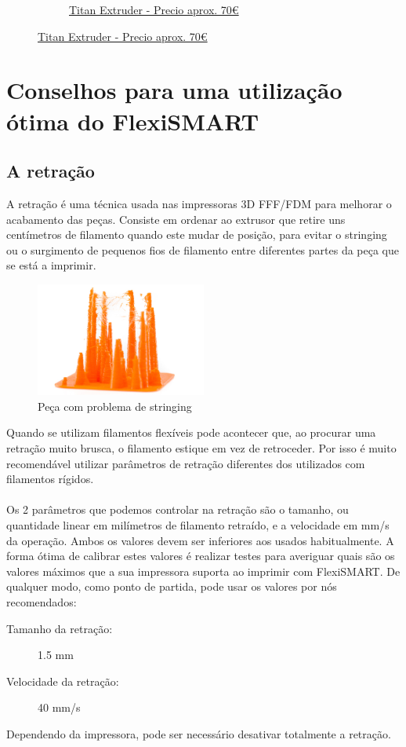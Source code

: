 \documentclass[11pt,a4paper]{article}
\begin{document}
\begin{figure}[H]
\begin{subfigure}[b]{0.4\textwidth}
		\caption*{\href{www.e3d-online.com}{{\footnotesize Titan Extruder - Precio aprox. 70\euro}}}
    \end{subfigure}
\end{figure}
\section{Conselhos para uma utilização ótima do FlexiSMART}
	\subsection{A retração}
A retração é uma técnica usada nas impressoras 3D FFF/FDM para melhorar o acabamento das peças. Consiste em ordenar ao extrusor que retire uns centímetros de filamento quando este mudar de posição, para evitar o stringing ou o surgimento de pequenos fios de filamento entre diferentes partes da peça que se está a imprimir.
\begin{figure}[H]
\centering
\includegraphics[width=0.5\textwidth,cfbox=azul_marcos 4pt 0pt]{FOTOS/RETRACCION1}
\caption*{Peça com problema de stringing}
\end{figure}
Quando se utilizam filamentos flexíveis pode acontecer que, ao procurar uma retração muito brusca, o filamento estique em vez de retroceder. Por isso é muito recomendável utilizar parâmetros de retração diferentes dos utilizados com filamentos rígidos.
\\\\
Os 2 parâmetros que podemos controlar na retração são o tamanho, ou quantidade linear em milímetros de filamento retraído, e a velocidade em mm/s da operação. Ambos os valores devem ser inferiores aos usados habitualmente. A forma ótima de calibrar estes valores é realizar testes para averiguar quais são os valores máximos que a sua impressora suporta ao imprimir com FlexiSMART. De qualquer modo, como ponto de partida, pode usar os valores por nós recomendados:
\begin{description}
\item [Tamanho da retração:] 1.5 mm
\item  [Velocidade da retração:] 40 mm/s
\end{description}
Dependendo da impressora, pode ser necessário desativar totalmente a retração.
\end{document}
